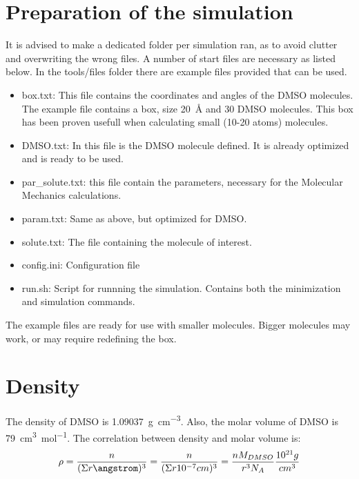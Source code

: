 \documentclass[a4paper,fleqn]{report}
\begin{document}
	
	\section{Preparation of the simulation}
	It is advised to make a dedicated folder per simulation ran, as to avoid 
	clutter and overwriting the wrong files.
	A number of start files are necessary as listed below.
	In the tools/files folder there are example files provided that can be 
	used.
	
	\begin{itemize}
		\setlength{\itemsep}{-1pt}
		\setlength{\parsep}{-1pt}
		\item box.txt: This file contains the coordinates and angles of the 
		DMSO molecules. The example file contains a box, size 
		\SI{20}{\angstrom} and 30 DMSO molecules.
		This box has been proven usefull when calculating 
		small (10-20 atoms) molecules.
		\item DMSO.txt: In this file is the DMSO molecule defined. It is 
		already optimized and is ready to be used.
		\item par\_solute.txt: this file contain the parameters, necessary for 
		the Molecular Mechanics calculations.\cite{Robertson2015}
		\item param.txt: Same as above, but optimized for DMSO.\cite{Liu1995}
		\item solute.txt: The file containing the molecule of interest.
		\item config.ini: Configuration file
		\item run.sh: Script for runnning the simulation. Contains both the 
		minimization and simulation commands.
	\end{itemize}
	
	The example files are ready for use with smaller molecules.
	Bigger molecules may work, or may require redefining the box.
	
	\section{Density}
	The density of DMSO is \SI{1.09037}{g cm^{-3}}.\cite{Radhamma2008}
	Also, the molar volume of DMSO is \SI{79}{cm^3 mol^{-1}}.
	The correlation between density and molar volume is:
	\begin{equation}
	\rho = \dfrac{n}{(\Sigma{r}{\angstrom})^3} = \dfrac{n}{(\Sigma{r}{10^{-7} 
	cm})^3} = \dfrac{n M_{DMSO}}{r^3 N_A} \dfrac{10^{21} g}{cm^3}
	\end{equation}

	\newpage
	\begin{spacing}{0.75}
		\label{Referenties}
		\clearpage
		\renewcommand{\bibname}{Referenties}
		
	\end{spacing}
	
	
\end{document}

